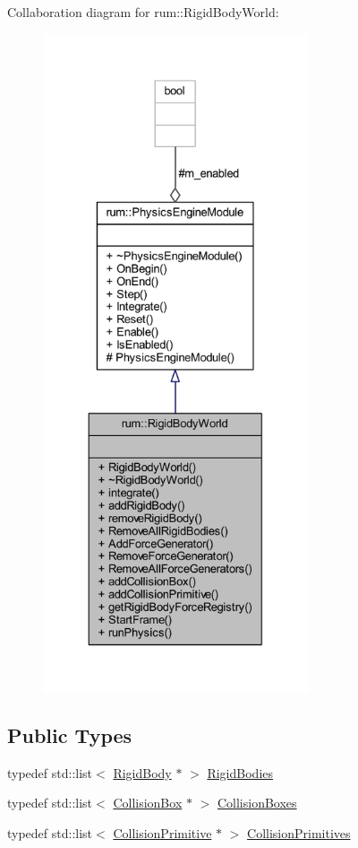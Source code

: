 Collaboration diagram for rum\+:\+:Rigid\+Body\+World\+:\nopagebreak
\begin{figure}[H]
\begin{center}
\leavevmode
\includegraphics[height=550pt]{classrum_1_1_rigid_body_world__coll__graph}
\end{center}
\end{figure}
\subsection*{Public Types}
\begin{DoxyCompactItemize}
\item 
typedef std\+::list$<$ \hyperlink{classrum_1_1_rigid_body}{Rigid\+Body} $\ast$ $>$ \hyperlink{classrum_1_1_rigid_body_world_afe5860f7166496b2adca2b8febe24b00}{Rigid\+Bodies}
\item 
typedef std\+::list$<$ \hyperlink{classrum_1_1_collision_box}{Collision\+Box} $\ast$ $>$ \hyperlink{classrum_1_1_rigid_body_world_a61fdadb1dd461f21c67f82c35ff08d1e}{Collision\+Boxes}
\item 
typedef std\+::list$<$ \hyperlink{classrum_1_1_collision_primitive}{Collision\+Primitive} $\ast$ $>$ \hyperlink{classrum_1_1_rigid_body_world_aac4ad352eb6647e1055b306c8dad6640}{Collision\+Primitives}
\end{DoxyCompactItemize}

